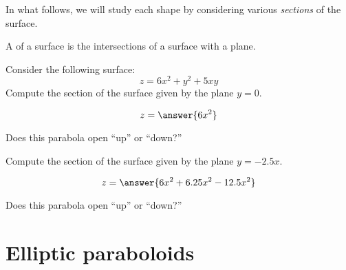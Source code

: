 \documentclass{ximera}
\begin{document}
In what follows, we will study each shape by considering various
\textit{sections} of the surface.

\begin{definition}
  A  of a surface is the intersections of a surface with
  a plane.
\end{definition}

\begin{question}
  Consider the following surface:
  \[
  z = 6x^2 + y^2 + 5 xy
  \]
  Compute the section of the surface given by the plane $y=0$.
  \begin{prompt}
    \[
    z = \answer{6x^2}
    \]
  \end{prompt}
  \begin{question}
    Does this parabola open ``up'' or ``down?''
    \begin{prompt}
    \begin{multipleChoice}
    \end{multipleChoice}
    \end{prompt}
    \begin{question}
      Compute the section of the surface given by the plane $y=-2.5 x$.
      \begin{prompt}
        \[
        z = \answer{6x^2 + 6.25 x^2 - 12.5x^2}
        \]
      \end{prompt}
      \begin{question}
        Does this parabola open ``up'' or ``down?''
        \begin{prompt}
          \begin{multipleChoice}
          \end{multipleChoice}
        \end{prompt}
      \end{question}
    \end{question}
  \end{question}
\end{question}

  





\section{Elliptic paraboloids}
\end{document}
